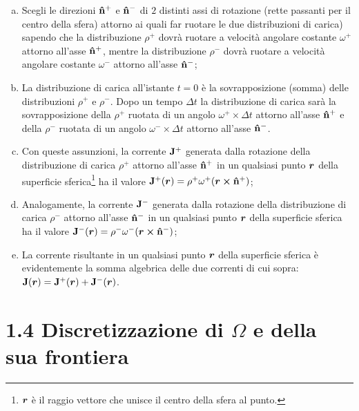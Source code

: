 \begin{enumerate}[(I)]
\begin{enumerate}[(a)]
	\item Scegli le direzioni $\vu{n}^+$ e $\vu{n}^-$ di $2$ distinti assi di rotazione (rette passanti per il centro della sfera) attorno ai quali far ruotare le due distribuzioni di carica) sapendo che la distribuzione $\rho^+$ dovrà ruotare a velocità angolare costante $\omega^+$  attorno all'asse $\vu{n}^+$, mentre la distribuzione $\rho^-$ dovrà ruotare a velocità angolare costante $\omega^-$  attorno all'asse $\vu{n}^-$; 
	\item La distribuzione di carica all'istante $t = 0$ è la sovrapposizione (somma) delle distribuzioni $\rho^+$ e $\rho^-$. Dopo un tempo $\Delta t$ la distribuzione di carica sarà la sovrapposizione della $\rho^+$ ruotata di un angolo $\omega^+ \times \Delta t$ attorno all'asse $\vu{n}^+$ e della $\rho^-$ ruotata di un angolo $\omega^- \times \Delta t$ attorno all'asse $\vu{n}^-$. 
	\item Con queste assunzioni, la corrente  $\vb{J}^+$ generata dalla rotazione della distribuzione di carica $\rho^+$ attorno all'asse $\vu{n}^+$ in un qualsiasi punto $\vb*{r}$ della superficie sferica\footnote{$\vb*{r}$ è il raggio vettore che unisce il centro della sfera al punto.} ha il valore $\vb{J}^+(\vb*{r}) = \rho^+ \omega^+ (\vb*{r} \cross \vu{n}^+)$;
	\item Analogamente, la corrente  $\vb{J}^-$ generata dalla rotazione della distribuzione di carica $\rho^-$ attorno all'asse $\vu{n}^-$ in un qualsiasi punto $\vb*{r}$ della superficie sferica ha il valore $\vb{J}^-(\vb*{r}) = \rho^- \omega^- (\vb*{r} \cross \vu{n}^-)$;
	\item La corrente risultante in un qualsiasi punto $\vb*{r}$ della superficie sferica è evidentemente la somma algebrica delle due correnti di cui sopra: $\vb{J}(\vb*{r}) = \vb{J}^+(\vb*{r}) + \vb{J}^-(\vb*{r})$.
	\end{enumerate}
\end{enumerate}

\section*{1.4 Discretizzazione di $\Omega$ e della sua frontiera}\label{sec_1.4}

